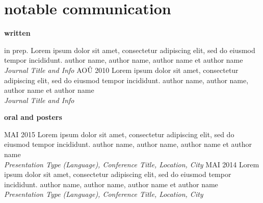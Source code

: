 \documentclass[print]{friggos-cv} %
\begin{document}
\section{notable communication}
\textbf{\large written}\vspace{10pt}\\
\begin{entrylist}
\entry
{in prep.}
{Lorem ipsum dolor sit amet, consectetur adipiscing elit, sed do eiusmod tempor incididunt.}
{}
{author name, author name, author name et author name\\\emph{Journal Title and Info}}
\entry
{AOÛ 2010}
{Lorem ipsum dolor sit amet, consectetur adipiscing elit, sed do eiusmod tempor incididunt.}
{}
{author name, author name, author name et author name\\\emph{Journal Title and Info}}
\end{entrylist}
\textbf{\large oral and posters}\vspace{10pt}\\
\begin{entrylist}
\entry
{MAI 2015}
{Lorem ipsum dolor sit amet, consectetur adipiscing elit, sed do eiusmod tempor incididunt.}
{}
{author name, author name, author name et author name\\\emph{Presentation Type (Language), Conference Title, Location, City}}
\entry
{MAI 2014}
{Lorem ipsum dolor sit amet, consectetur adipiscing elit, sed do eiusmod tempor incididunt.}
{}
{author name, author name, author name et author name\\\emph{Presentation Type (Language), Conference Title, Location, City}}
\end{entrylist}

\end{document}
